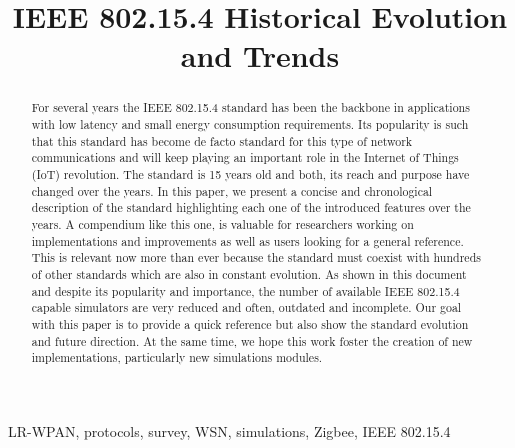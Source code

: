 \documentclass[conference]{IEEEtran}
\begin{document}
\title{IEEE 802.15.4 Historical Evolution and Trends}
\author{
\and
{}
}

\maketitle

\begin{abstract}
For several years the IEEE 802.15.4 standard has been the backbone in applications with low latency and small energy consumption requirements. Its popularity is such that this standard has become de facto standard for this type of network communications and will keep playing an important role in the Internet of Things (IoT) revolution. The standard is 15 years old and both, its reach and purpose have changed over the years. In this paper, we present a concise and chronological description of the standard highlighting each one of the introduced features over the years. A compendium like this one, is valuable for researchers working on implementations and improvements as well as users looking for a general reference. This is relevant now more than ever because the standard must coexist with hundreds of other standards which are also in constant evolution. As shown in this document and despite its popularity and importance, the number of available IEEE 802.15.4 capable simulators are very reduced and often, outdated and incomplete. Our goal with this paper is to provide a quick reference but also show the standard evolution and future direction. At the same time, we hope this work foster the creation of new implementations, particularly new simulations modules.
 
\end{abstract}

\begin{IEEEkeywords}
LR-WPAN, protocols, survey, WSN, simulations, Zigbee, IEEE 802.15.4
\end{IEEEkeywords}
\end{document}
